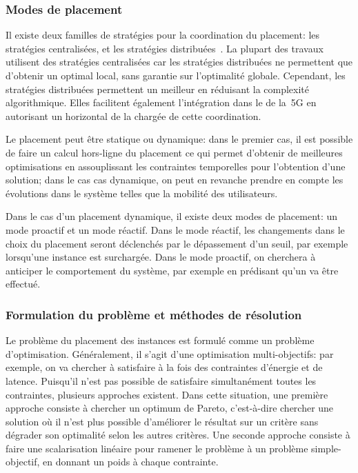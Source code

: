 \documentclass[../main.tex]{subfiles}
\begin{document}
\pagebreak
\subsubsection{Modes de placement}
Il existe deux familles de stratégies pour la coordination du placement: les stratégies centralisées, et les stratégies distribuées~\cite{10.1145/3391196}. La plupart des travaux utilisent des stratégies centralisées car les stratégies distribuées ne permettent que d’obtenir un optimal local, sans garantie sur l’optimalité globale.
Cependant, les stratégies distribuées permettent un meilleur  en réduisant la complexité algorithmique.
Elles facilitent également l’intégration dans le  de la~5G en autorisant un  horizontal de la  chargée de cette coordination.

Le placement peut être statique ou dynamique: dans le premier cas, il est possible de faire un calcul hors-ligne du placement ce qui permet d’obtenir de meilleures optimisations en assouplissant les contraintes temporelles pour l’obtention d’une solution; dans le cas cas dynamique, on peut en revanche prendre en compte les évolutions dans le système telles que la mobilité des utilisateurs.

Dans le cas d’un placement dynamique, il existe deux modes de placement: un mode proactif et un mode réactif.
Dans le mode réactif, les changements dans le choix du placement seront déclenchés par le dépassement d’un seuil, par exemple lorsqu’une instance est surchargée.
Dans le mode proactif, on cherchera à anticiper le comportement du système, par exemple en prédisant qu’un  va être effectué.

\subsubsection{Formulation du problème et méthodes de résolution}
Le problème du placement des instances est formulé comme un problème d’optimisation.
Généralement, il s’agit d’une optimisation multi-objectifs: par exemple, on va chercher à satisfaire à la fois des contraintes d’énergie et de latence.
Puisqu’il n’est pas possible de satisfaire simultanément toutes les contraintes, plusieurs approches existent.
Dans cette situation, une première approche consiste à chercher un optimum de Pareto, c’est-à-dire chercher une solution où il n’est plus possible d’améliorer le résultat sur un critère sans dégrader son optimalité selon les autres critères.
Une seconde approche consiste à faire une scalarisation linéaire pour ramener le problème à un problème simple-objectif, en donnant un poids à chaque contrainte.
\end{document}
